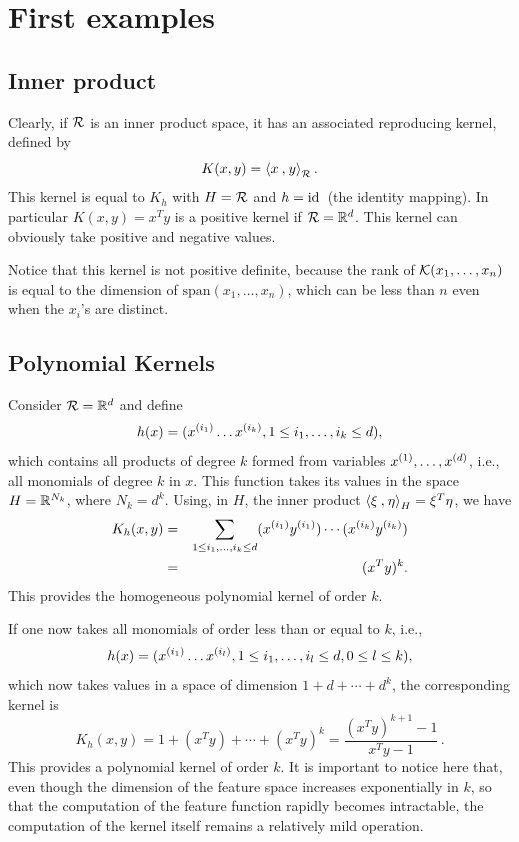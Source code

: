 %
%
\section{First examples}

\subsection{Inner product}
Clearly, if ${\mathcal R}$ is an inner product space, it has an associated reproducing kernel, defined by
\[
K(x,y) = {\langle {x}\mathbin{,} {y}\rangle}_{{\mathcal R}}\,.
\]
This kernel is equal to $K_h$ with $H = {\mathcal R}$ and $h={\mathrm{id}}\,$ (the identity mapping). In particular $K(x,y) = x^Ty$ is a positive kernel if ${\mathcal R} = {\mathbb{R}}^d$. This kernel can obviously take positive and negative values.

Notice that this kernel is not positive definite, because the rank of ${\mathcal K}(x_1, \ldots, x_n)$ is equal to the dimension of $\mathrm{span}(x_1, \dots, x_n)$, which can be less than $n$ even when the $x_i$'s are distinct. 

\subsection{Polynomial Kernels}

Consider ${\mathcal R} = {\mathbb{R}}^d$ and define 
\[
h(x) = (x^{(i_1)} \dots x^{(i_k)}, 1\leq i_1, \ldots, i_k \leq d),
\]
 which contains all products of degree $k$ formed from variables $x^{(1)}, \ldots,x^{(d)}$, i.e., all monomials of degree $k$ in $x$. This function takes its values in the space $H = {\mathbb{R}}^{N_k}$, where $N_k = d^k$. Using, in $H$, the inner product ${\langle {\xi}\mathbin{,} {\eta}\rangle}_H = \xi^T\eta$, we have
\begin{eqnarray*}
K_h(x,y)& =& \sum_{1\leq i_1, \ldots, i_k\leq d} (x^{(i_1)}y^{(i_1)})
\cdots (x^{(i_k)} y^{(i_k)})\\
&=& (x^Ty)^k.
\end{eqnarray*}
This provides  the homogeneous polynomial kernel of order $k$.

If one now takes all monomials of order less than or equal to $k$, i.e.,  
\[
h(x) = (x^{(i_1)} \dots x^{(i_l)}, 1\leq i_1, \ldots, i_l \leq d, 0\leq l\leq k),
\]
 which now takes values in a space of dimension $1 + d + \cdots + d^k$, the corresponding kernel is 
$$
K_h(x,y) = 1 + (x^Ty) + \cdots + (x^Ty)^k =
\frac{(x^Ty)^{k+1} - 1}{x^Ty - 1}\,.
$$
This provides a polynomial kernel of order $k$. It is important to notice here that, even though the dimension of the feature space increases exponentially in $k$, so that the computation of the feature function rapidly becomes intractable, the computation of the kernel itself remains a relatively mild operation. 

